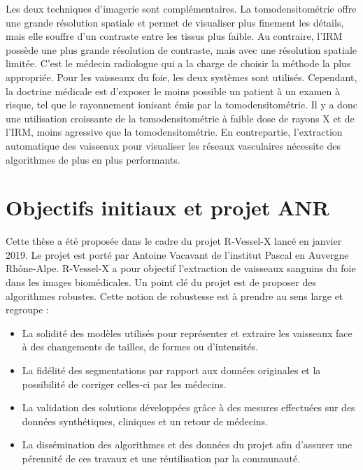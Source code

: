 Les deux techniques d'imagerie sont complémentaires. La tomodensitométrie offre une grande résolution spatiale et permet de visualiser plus finement les détails, mais elle souffre d'un contraste entre les tissus plus faible. Au contraire, l'IRM possède une plus grande résolution de contraste, mais avec une résolution spatiale limitée. C'est le médecin radiologue qui a la charge de choisir la méthode la plus appropriée. Pour les vaisseaux du foie, les deux systèmes sont utilisés. Cependant, la doctrine médicale est d'exposer le moins possible un patient à un examen à risque, tel que le rayonnement ionisant émis par la tomodensitométrie. Il y a donc une utilisation croissante de la tomodensitométrie à faible dose de rayons X et de l'IRM, moins agressive que la tomodensitométrie. En contrepartie, l'extraction automatique des vaisseaux pour visualiser les réseaux vasculaires nécessite des algorithmes de plus en plus performants.


\section{Objectifs initiaux et projet ANR}
\label{sec:introduction:objectifs}

Cette thèse a été proposée dans le cadre du projet R-Vessel-X lancé en janvier 2019. Le projet est porté par Antoine Vacavant de l'institut Pascal en Auvergne Rhône-Alpe. R-Vessel-X a pour objectif l'extraction de vaisseaux sanguins du foie dans les images biomédicales. Un point clé du projet est de proposer des algorithmes robustes. Cette notion de robustesse est à prendre au sens large et regroupe :

\begin{itemize}
\item La solidité des modèles utilisés pour représenter et extraire les vaisseaux face à des changements de tailles, de formes ou d'intensités.
\item La fidélité des segmentations par rapport aux données originales et la possibilité de corriger celles-ci par les médecins.
\item La validation des solutions développées grâce à des mesures effectuées sur des données synthétiques, cliniques et un retour de médecins.
\item La dissémination des algorithmes et des données du projet afin d'assurer une pérennité de ces travaux et une réutilisation par la communauté.
\end{itemize}

